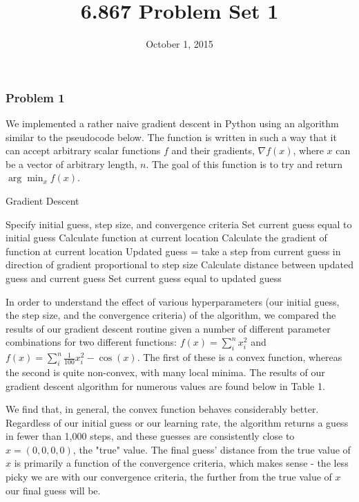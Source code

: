 \documentclass[10pt]{article}
\begin{document}
	\title{6.867 Problem Set 1}
	\date{October 1, 2015}
	\maketitle
	
\subsubsection*{Problem 1}

We implemented a rather naive gradient descent in Python using an algorithm similar to the pseudocode below. The function is written in such a way that it can accept arbitrary scalar functions $f$ and their gradients, $\nabla f(x)$, where $x$ can be a vector of arbitrary length, $n$. The goal of this function is to try and return $\arg\min_x {f(x)}$.

\begin{algorithm}
\caption{Gradient Descent}
\label{GradDescent}
\begin{algorithmic}[1]
\State Specify initial guess, step size, and convergence criteria
\State Set current guess equal to initial guess
\State Calculate function at current location
\State Calculate the gradient of function at current location
\State Updated guess = take a step from current guess in direction of gradient proportional to step size
\State Calculate distance between updated guess and current guess
\State Set current guess equal to updated guess
\EndWhile{}
\EndProcedure
\end{algorithmic}
\end{algorithm}

In order to understand the effect of various hyperparameters (our initial guess, the step size, and the convergence criteria) of the algorithm, we compared the results of our gradient descent routine given a number of different parameter combinations for two different functions: $f(x) = \sum_i^n x_i^2$ and $f(x) = \sum_i^n \frac{1}{100}x_i^2 - \cos(x)$. The first of these is a convex function, whereas the second is quite non-convex, with many local minima. The results of our gradient descent algorithm for numerous values are found below in Table 1.

We find that, in general, the convex function behaves considerably better. Regardless of our initial guess or our learning rate, the algorithm returns a guess in fewer than 1,000 steps, and these guesses are consistently close to $x = (0,0,0,0)$, the "true" value. The final guess' distance from the true value of $x$ is primarily a function of the convergence criteria, which makes sense - the less picky we are with our convergence criteria, the further from the true value of $x$ our final guess will be.
\end{document}
